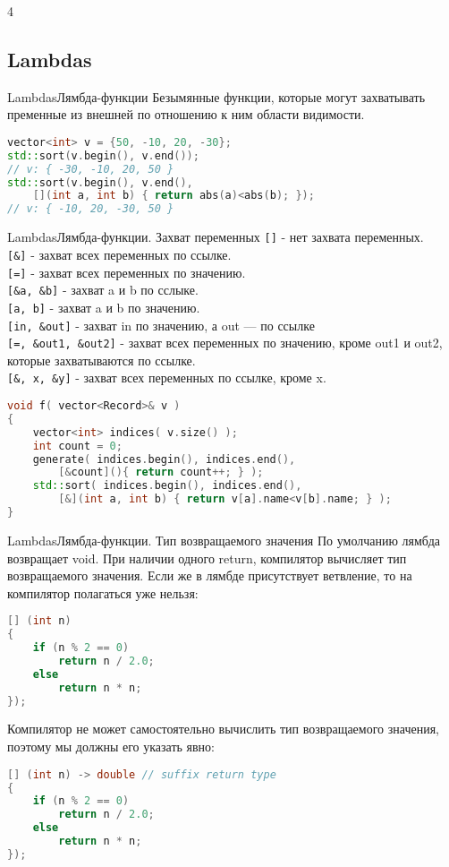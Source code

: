 4\documentclass[10pt]{beamer}
\begin{document}
\subsection{Lambdas}
\hypertarget{Lambdas}{}
\begin{frame}[fragile]{Lambdas}{Лямбда-функции}
Безымянные функции, которые могут захватывать пременные из внешней по отношению к ним области видимости.
\begin{lstlisting}[language=C++]
vector<int> v = {50, -10, 20, -30};
std::sort(v.begin(), v.end());
// v: { -30, -10, 20, 50 }
std::sort(v.begin(), v.end(), 
    [](int a, int b) { return abs(a)<abs(b); });
// v: { -10, 20, -30, 50 }
\end{lstlisting}
\end{frame}
\begin{frame}[fragile]{Lambdas}{Лямбда-функции. Захват переменных}
\texttt{[]} - нет захвата переменных.\\\texttt{[\&]} - захват всех переменных по ссылке.\\ \texttt{[=]} - захват всех переменных по значению.\\ \texttt{[\&a, \&b]} - захват a и b  по сслыке.\\ \texttt{[a, b]} - захват a и b по значению.\\\texttt{[in, \&out]} - захват in по значению, а out — по ссылке\\ \texttt{[=, \&out1, \&out2]} - захват всех переменных по значению, кроме out1 и out2, которые захватываются по ссылке.\\\texttt{[\&, x, \&y]} - захват всех переменных по ссылке, кроме x.
\begin{lstlisting}[language=C++]
void f( vector<Record>& v )
{
    vector<int> indices( v.size() );
    int count = 0;
    generate( indices.begin(), indices.end(), 
        [&count](){ return count++; } );
    std::sort( indices.begin(), indices.end(), 
        [&](int a, int b) { return v[a].name<v[b].name; } );
}
\end{lstlisting}
\end{frame}
\begin{frame}[fragile]{Lambdas}{Лямбда-функции. Тип возвращаемого значения}
По умолчанию лямбда возвращает void. При наличии одного return, компилятор вычисляет тип возвращаемого значения. Если же в лямбде присутствует ветвление, то на компилятор полагаться уже нельзя:
\begin{lstlisting}[language=C++]
[] (int n) 
{ 
    if (n % 2 == 0)
        return n / 2.0;
    else
        return n * n;
});
\end{lstlisting}
Компилятор не может самостоятельно вычислить тип возвращаемого значения, поэтому мы должны его указать явно:
\begin{lstlisting}[language=C++]
[] (int n) -> double // suffix return type
{ 
    if (n % 2 == 0)
        return n / 2.0;
    else
        return n * n;
});
\end{lstlisting}
\end{frame}
\end{document}
